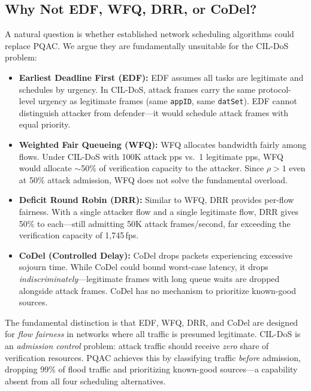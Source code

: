 \documentclass[journal]{IEEEtran}
\begin{document}
\subsection{Why Not EDF, WFQ, DRR, or CoDel?}
A natural question is whether established network scheduling algorithms could replace PQAC. We argue they are fundamentally unsuitable for the CIL-DoS problem:

\begin{itemize}[leftmargin=*]
    \item \textbf{Earliest Deadline First (EDF):} EDF assumes all tasks are legitimate and schedules by urgency. In CIL-DoS, attack frames carry the same protocol-level urgency as legitimate frames (same \texttt{appID}, same \texttt{datSet}). EDF cannot distinguish attacker from defender---it would schedule attack frames with equal priority.
    
    \item \textbf{Weighted Fair Queueing (WFQ):} WFQ allocates bandwidth fairly among flows. Under CIL-DoS with 100K attack pps vs.\ 1 legitimate pps, WFQ would allocate $\sim$50\% of verification capacity to the attacker. Since $\rho > 1$ even at 50\% attack admission, WFQ does not solve the fundamental overload.
    
    \item \textbf{Deficit Round Robin (DRR):} Similar to WFQ, DRR provides per-flow fairness. With a single attacker flow and a single legitimate flow, DRR gives 50\% to each---still admitting 50K attack frames/second, far exceeding the verification capacity of 1,745\,fps.
    
    \item \textbf{CoDel (Controlled Delay):} CoDel drops packets experiencing excessive sojourn time. While CoDel could bound worst-case latency, it drops \emph{indiscriminately}---legitimate frames with long queue waits are dropped alongside attack frames. CoDel has no mechanism to prioritize known-good sources.
\end{itemize}

The fundamental distinction is that EDF, WFQ, DRR, and CoDel are designed for \emph{flow fairness} in networks where all traffic is presumed legitimate. CIL-DoS is an \emph{admission control} problem: attack traffic should receive \emph{zero} share of verification resources. PQAC achieves this by classifying traffic \emph{before} admission, dropping 99\% of flood traffic and prioritizing known-good sources---a capability absent from all four scheduling alternatives.
\end{document}
